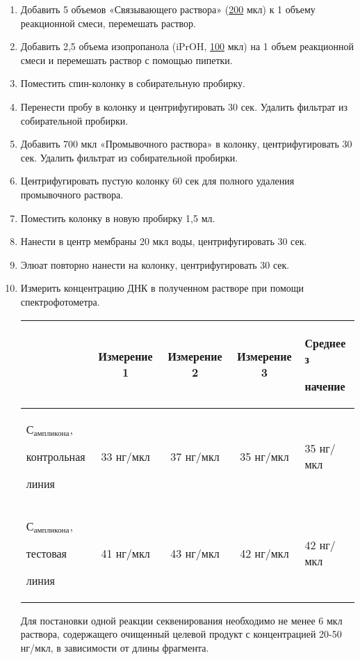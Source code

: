 \begin{enumerate}
    \item Добавить 5 объемов «Связывающего раствора» (\underline{200} мкл) к 1 объему реакционной смеси, перемешать раствор.
    \item Добавить 2,5 объема изопропанола (iPrOH, \underline{100} мкл) на 1 объем реакционной смеси и перемешать раствор с помощью пипетки.
    \item Поместить спин-колонку в собирательную пробирку.
    \item Перенести пробу в колонку и центрифугировать 30 сек. Удалить фильтрат из собирательной пробирки.
    \item Добавить 700 мкл «Промывочного раствора» в колонку, центрифугировать 30 сек. Удалить фильтрат из собирательной пробирки.
    \item Центрифугировать пустую колонку 60 сек для полного удаления промывочного раствора.
    \item Поместить колонку в новую пробирку 1,5 мл.
    \item Нанести в центр мембраны 20 мкл воды, центрифугировать 30 сек.
    \item Элюат повторно нанести на колонку, центрифугировать 30 сек.
    \item Измерить концентрацию ДНК в полученном растворе при помощи спектрофотометра.
 
    \begin{tabular}{|p{2.5cm}|c|c|c|p{2.5cm}|}
        \hline
        & Измерение 1 & Измерение 2 & Измерение 3 & Среднее з
        
        начение \\
        \hline
        $\text{С}_\text{ампликона}$, 
        
        контрольная 
        
        линия & 33 нг/мкл & 37 нг/мкл & 35 нг/мкл & 35 нг/мкл \\
        \hline
        $\text{С}_\text{ампликона}$, 
        
        тестовая 
        
        линия & 41 нг/мкл & 43 нг/мкл & 42 нг/мкл & 42 нг/мкл \\
        \hline
    \end{tabular}    

    \explanationSection
    
    Для постановки одной реакции секвенирования необходимо не менее 6 мкл раствора, содержащего очищенный целевой продукт с концентрацией 20-50 нг/мкл, в зависимости от длины фрагмента.
\end{enumerate}

